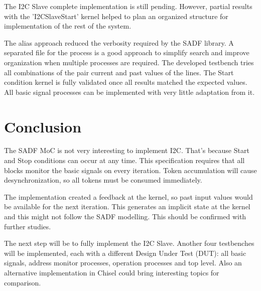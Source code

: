 \documentclass{article}
\begin{document}
The I2C Slave complete implementation is still pending. However, partial results with the 'I2CSlaveStart' kernel helped to plan an organized structure for implementation of the rest of the system. 

The alias approach reduced the verbosity required by the SADF library. A separated file for the process is a good approach to simplify search and improve organization when multiple processes are required.
The developed testbench tries all combinations of the pair current and past values of the lines. The Start condition kernel is fully validated once all results matched the expected values. All basic signal processes can be implemented with very little adaptation from it.


\section{Conclusion} \label{sec:concl}
The SADF MoC is not very interesting to implement I2C. That's because Start and Stop conditions can occur at any time. This specification requires that all blocks monitor the basic signals on every iteration. Token accumulation will cause desynchronization, so all tokens must be consumed immediately.



The implementation created a feedback at the kernel, so past input values would be available for the next iteration. This generates an implicit state at the kernel and this might not follow the SADF modelling. This should be confirmed with further studies.

The next step will be to fully implement the I2C Slave. Another four testbenches will be implemented, each with a different Design Under Test (DUT): all basic signals, address monitor processes, operation processes and top level. Also an alternative implementation in Chisel could bring interesting topics for comparison.
\end{document}
